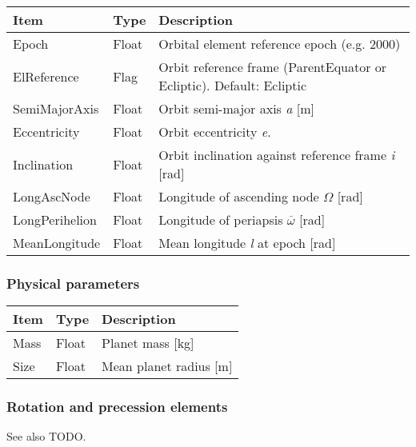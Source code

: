 \documentclass[Orbiter Developer Manual.tex]{subfiles}
\begin{document}
	\begin{longtable}{ |p{}|p{}|p{}| }
	\hline\rule{0pt}{2ex}
	\textbf{Item} & \textbf{Type} & \textbf{Description}\\
	\hline\rule{0pt}{2ex}
	Epoch & Float & Orbital element reference epoch (e.g. 2000)\\
	\hline\rule{0pt}{2ex}
	ElReference & Flag & Orbit reference frame (ParentEquator or Ecliptic). Default: Ecliptic\\
	\hline\rule{0pt}{2ex}
	SemiMajorAxis & Float & Orbit semi-major axis \textit{a} [m]\\
	\hline\rule{0pt}{2ex}
	Eccentricity & Float & Orbit eccentricity \textit{e}.\\
	\hline\rule{0pt}{2ex}
	Inclination & Float & Orbit inclination against reference frame \textit{i} [rad]\\
	\hline\rule{0pt}{2ex}
	LongAscNode & Float & Longitude of ascending node $\Omega$ [rad]\\
	\hline\rule{0pt}{2ex}
	LongPerihelion & Float & Longitude of periapsis $\overline{\omega}$ [rad]\\
	\hline\rule{0pt}{2ex}
	MeanLongitude & Float & Mean longitude \textit{l} at epoch [rad]\\
	\hline
	\end{longtable}


\subsubsection*{Physical parameters}
	\begin{longtable}{ |p{}|p{}|p{}| }
	\hline\rule{0pt}{2ex}
	\textbf{Item} & \textbf{Type} & \textbf{Description}\\
	\hline\rule{0pt}{2ex}
	Mass & Float & Planet mass [kg]\\
	\hline\rule{0pt}{2ex}
	Size & Float & Mean planet radius [m]\\
	\hline
	\end{longtable}


\subsubsection*{Rotation and precession elements}
See also TODO.
\end{document}
